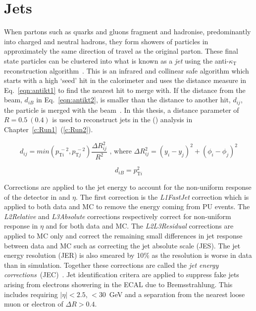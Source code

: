 \section{Jets \label{sec:jetreco}}
When partons such as quarks and gluons fragment and hadronise, predominantly into charged and neutral hadrons, they form showers of particles in approximately the same direction of travel as the original parton. These final state particles can be clustered into what is known as a \emph{jet} using the anti-$\kappa_{\textrm{T}}$ reconstruction algorithm~\cite{Cacciari:2008gp}. This is an infrared and collinear safe algorithm which starts with a high \pt `seed' hit in the calorimeter and uses the distance measure in Eq.~\ref{eqn:antikt1} to find the nearest hit to merge with. If the distance from the beam, $d_{iB}$ in Eq.~\ref{eqn:antikt2}, is smaller than the distance to another hit, $d_{ij}$, the particle is merged with the beam~\cite{Salam2010}. In this thesis, a distance parameter of $R = 0.5~\left(0.4\right)$ is used to reconstruct jets in the \runone (\runtwo) analysis in Chapter~\ref{c:Run1}~(\ref{c:Run2}). 


\begin{equation}
d_{ij}=min\left( p_{\textrm{T}i}^{~-2},p_{\textrm{T}j}^{~-2} \right) \frac{\Delta R_{ij}^{2}}{R^{2}} \textrm{ , where } \Delta R_{ij}^{2} = {\left( y_{i} - y_{j}\right)}^{2} +  {\left( {\phi}_{i} - {\phi}_{j}\right)}^{2}
\label{eqn:antikt1}
\end{equation}

\begin{equation}
d_{iB}=p_{\textrm{T}i}^{2}
\label{eqn:antikt2}
\end{equation}

Corrections are applied to the jet energy to account for the non-uniform response of the detector in \pt and $\eta$. The first correction is the \emph{L1FastJet} correction which is applied to both data and MC to remove the energy coming from PU events. The \emph{L2Relative} and \emph{L3Absolute} corrections respectively correct for non-uniform response in $\eta$ and \pt for both data and MC. The \emph{L2L3Residual} corrections are applied to MC only and correct the remaining small differences in jet response between data and MC such as correcting the jet absolute scale (JES). The jet energy resolution (JER) is also smeared by 10$\%$ as the resolution is worse in data than in simulation. Together these corrections are called the \emph{jet energy corrections}~(JEC)~\cite{Khachatryan:2016kdb}.
Jet identification critera are applied to suppress fake jets arising from electrons showering in the ECAL due to Bremsstrahlung. This includes requiring $|\eta|<2.5$, \pt$<30$~GeV and a separation from the nearest loose muon or electron of $\Delta R>0.4$.

